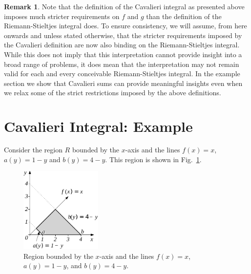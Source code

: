 \documentclass{article}
\theoremstyle{theorem}
\theoremstyle{definition}
\newtheorem*{remark}{Remark}
\begin{document}
\begin{remark}
Note that the definition of the Cavalieri integral as presented above imposes much stricter requirements on $f$ and $g$ than the 
definition of the Riemann-Stieltjes integral does. To ensure consistency, we will assume, from here onwards and unless stated otherwise, that the stricter requirements imposed 
by the Cavalieri definition are now also binding on the Riemann-Stieltjes integral. 
While this does not imply that this interpretation cannot provide insight into a broad range of problems, it does mean that the interpretation may not remain valid for each and every conceivable Riemann-Stieltjes integral.
In the example section we show that Cavalieri sums can provide meaningful insights even 
when we relax some of the strict restrictions imposed by the above definitions.
\end{remark}

\section{Cavalieri Integral: Example}

Consider the region $R$ bounded by the $x$-axis and the lines $f(x)=x$, $a(y)=1-y$ and $b(y)=4-y$. This region is shown in Fig.~\ref{fig:ex1}.\\
\begin{figure}[htb]
\centering
\includegraphics[width=0.36\textwidth]{fig12}
\caption{Region bounded by the $x$-axis and the lines $f(x)=x$, $a(y)=1-y$, and $b(y)=4-y$.}
\label{fig:ex1}
\end{figure}
\end{document}
